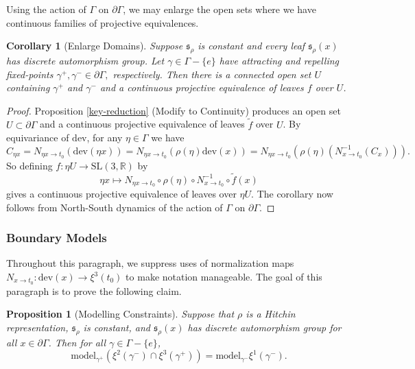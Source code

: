 \documentclass[12pt,a4paper]{amsart}
\newcommand{\bbR}{\mathbb R}
\theoremstyle{definition}
\theoremstyle{plain}
\newtheorem{proposition}[theorem]{Proposition}
\newtheorem{corollary}[theorem]{Corollary}
\numberwithin{equation}{section}
\begin{document}
Using the action of $\Gamma$ on $\partial \Gamma$, we may enlarge the open sets where we have continuous families of projective equivalences.

\begin{corollary}[Enlarge Domains]\label{corollary-enlarge-domains}
    Suppose $\mathfrak{s}_\rho$ is constant and every leaf $\mathfrak{s}_\rho(x)$ has discrete automorphism group. Let $\gamma \in \Gamma - \{e\}$ have attracting and repelling fixed-points $\gamma^+, \gamma^- \in \partial \Gamma,$ respectively. Then there is a connected open set $U$ containing $\gamma^+$ and $\gamma^-$ and a continuous projective equivalence of leaves $f$ over $U$.
\end{corollary}

\begin{proof}
    Proposition \ref{key-reduction} (Modify to Continuity) produces an open set $U \subset \partial \Gamma$ and a continuous projective equivalence of leaves $\widetilde{f}$ over $U$. By equivariance of $\text{dev}$, for any $\eta \in \Gamma$ we have $$C_{\eta x} = N_{\eta x \to t_0}(\text{dev}(\eta x)) = N_{\eta x\to t_0}(\rho(\eta) \text{dev}(x)) = N_{\eta x \to t_0} (\rho(\eta)(N_{x \to t_0}^{-1}(C_x))).$$ So defining $f: \eta U \to \text{SL}(3,\bbR)$ by $$\eta x \mapsto N_{\eta x \to t_0} \circ \rho(\eta) \circ N_{x \to t_0}^{-1} \circ \widetilde{f}(x) $$ gives a continuous projective equivalence of leaves over $\eta U$. The corollary now follows from North-South dynamics of the action of $\Gamma$ on $\partial \Gamma$.
\end{proof}

\subsubsection{Boundary Models}\label{subsubsection-discrete-continuity-to-eigenvalues} Throughout this paragraph, we suppress uses of normalization maps $N_{x \to t_0}: \text{dev}(x) \to \xi^3(t_0)$ to make notation manageable. The goal of this paragraph is to prove the following claim.

\begin{proposition}[Modelling Constraints]\label{I-was-dumb}
Suppose that $\rho$ is a Hitchin representation, $\mathfrak{s}_\rho$ is constant, and $\mathfrak{s}_\rho(x)$ has discrete automorphism group for all $x \in \partial \Gamma$. Then for all $\gamma \in \Gamma - \{e\}$, {\rm{$$\text{model}_{\gamma^+}(\xi^2(\gamma^-) \cap \xi^3(\gamma^+)) = \text{model}_{\gamma^-} \xi^1(\gamma^-).$$}} 
\end{proposition}
\end{document}
